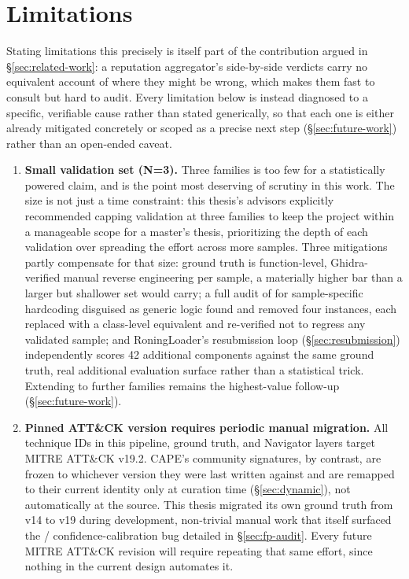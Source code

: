 \section{Limitations}
\label{sec:limitations}

Stating limitations this precisely is itself part of the
contribution argued in \S\ref{sec:related-work}: a reputation
aggregator's side-by-side verdicts carry no equivalent account of where
they might be wrong, which makes them fast to consult but hard to
audit. Every limitation below is instead diagnosed to a specific,
verifiable cause rather than stated generically, so that each one is
either already mitigated concretely or scoped as a precise next step
(\S\ref{sec:future-work}) rather than an open-ended caveat.

\begin{enumerate}

\item \label{lim:n3} \textbf{Small validation set (N=3).} Three families is too few
  for a statistically powered claim, and is the point most deserving of
  scrutiny in this work. The size is not just a time constraint: this
  thesis's advisors explicitly recommended capping validation at three
  families to keep the project within a manageable scope for a
  master's thesis, prioritizing the depth of each validation over
  spreading the effort across more samples. Three mitigations partly
  compensate for that size: ground truth is
  function-level, Ghidra-verified manual reverse engineering per sample,
  a materially higher bar than a larger but shallower set would carry;
  a full audit of  for
  sample-specific hardcoding disguised as generic logic found and
  removed four instances, each replaced with a
  class-level equivalent and re-verified not to regress any validated
  sample; and RoningLoader's resubmission loop (\S\ref{sec:resubmission})
  independently scores 42 additional components against the same
  ground truth, real additional evaluation surface rather than a
  statistical trick. Extending to further families remains the
  highest-value follow-up (\S\ref{sec:future-work}).

\item \label{lim:attck-version} \textbf{Pinned ATT\&CK version requires
  periodic manual migration.} All technique IDs in this pipeline,
  ground truth, and Navigator layers target MITRE ATT\&CK v19.2.
  CAPE's community signatures, by contrast, are frozen to whichever
  version they were last written against and are remapped to their
  current identity only at curation time (\S\ref{sec:dynamic}), not
  automatically at the source. This thesis migrated its own ground
  truth from v14 to v19 during development, non-trivial manual work
  that itself surfaced the
  / confidence-calibration bug
  detailed in \S\ref{sec:fp-audit}. Every future MITRE ATT\&CK revision
  will require repeating that same effort, since nothing in the current
  design automates it.


\end{enumerate}

